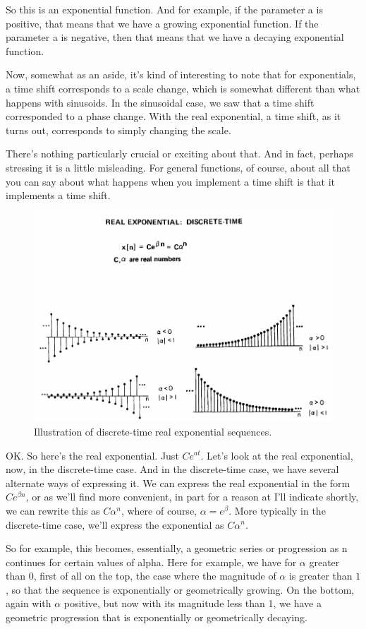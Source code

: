 \documentclass[fleqn,10pt]{olplainarticle}
\theoremstyle{definition}
\theoremstyle{remark}
\begin{document}
So this is an exponential function. And for example, if the parameter a is positive, that means that we have a growing exponential function. If the parameter a is negative, then that means that we have a decaying exponential function.

Now, somewhat as an aside, it's kind of interesting to note that for exponentials, a time shift corresponds to a scale change, which is somewhat different than what happens with sinusoids. In the sinusoidal case, we saw that a time shift corresponded to a phase change. With the real exponential, a time shift, as it turns out, corresponds to simply changing the scale.

There's nothing particularly crucial or exciting about that. And in fact, perhaps stressing it is a little misleading. For general functions, of course, about all that you can say about what happens when you implement a time shift is that it implements a time shift.

\begin{figure}[ht]
	\centering
	\includegraphics[width=0.7\linewidth]{images/signals_16.png}
	\caption{Illustration of discrete-time real exponential sequences.}
	\label{fig:signals_16}
\end{figure}

OK. So here's the real exponential. Just $Ce^{at}$. Let's look at the real exponential, now, in the discrete-time case. And in the discrete-time case, we have several alternate ways of expressing it. We can express the real exponential in the form $Ce^{\beta n}$, or as we'll find more convenient, in part for a reason at I'll indicate shortly, we can rewrite this as $C\alpha^n$, where of course, $\alpha = e^\beta$. More typically in the discrete-time case, we'll express the exponential as $C\alpha^n$.

So for example, this becomes, essentially, a geometric series or progression as n continues for certain values of alpha. Here for example, we have for $\alpha$ greater than $0$, first of all on the top, the case where the magnitude of $\alpha$ is greater than $1$, so that the sequence is exponentially or geometrically growing. On the bottom, again with $\alpha$ positive, but now with its magnitude less than 1, we have a geometric progression that is exponentially or geometrically decaying.
\end{document}
